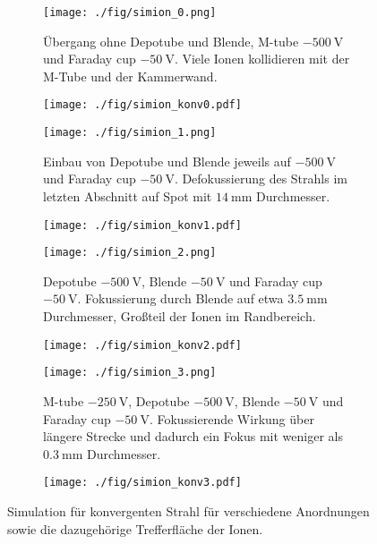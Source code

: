 \begin{figure}
  \begin{subfigure}[h]{0.50\textwidth}
    \texttt{[image: ./fig/simion\_0.png]}
    \caption{Übergang ohne Depotube und Blende, M-tube $\SI{-500}{\volt}$ und Faraday cup $\SI{-50}{\volt}$. Viele Ionen kollidieren mit der M-Tube und der Kammerwand.}
    \label{fig:konv0}
  \end{subfigure}\hfill
  \begin{subfigure}[h]{0.4\textwidth}
    \texttt{[image: ./fig/simion\_konv0.pdf]}
    \label{fig:konv1}
  \end{subfigure}\hfill
  \begin{subfigure}[h]{0.50\textwidth}
    \texttt{[image: ./fig/simion\_1.png]}
    \caption{Einbau von Depotube und Blende jeweils auf $\SI{-500}{\volt}$ und Faraday cup $\SI{-50}{\volt}$. Defokussierung des Strahls im letzten Abschnitt auf Spot mit $\SI{14}{\mm}$ Durchmesser.}
    \label{fig:konv2}
  \end{subfigure}\hfill
  \begin{subfigure}[h]{0.4\textwidth}
    \texttt{[image: ./fig/simion\_konv1.pdf]}
    \label{fig:konv3}
  \end{subfigure}\hfill
  \begin{subfigure}[h]{0.50\textwidth}
    \texttt{[image: ./fig/simion\_2.png]}
    \caption{Depotube $\SI{-500}{\volt}$, Blende $\SI{-50}{\volt}$ und Faraday cup $\SI{-50}{\volt}$. Fokussierung durch Blende auf etwa $\SI{3,5}{\mm}$ Durchmesser, Großteil der Ionen im Randbereich.}
    \label{fig:konv4}
  \end{subfigure}\hfill
  \begin{subfigure}[h]{0.4\textwidth}
    \texttt{[image: ./fig/simion\_konv2.pdf]}
    \label{fig:konv5}
  \end{subfigure}\hfill
  \begin{subfigure}[h]{0.50\textwidth}
    \texttt{[image: ./fig/simion\_3.png]}
    \caption{M-tube $\SI{-250}{\volt}$, Depotube $\SI{-500}{\volt}$, Blende $\SI{-50}{\volt}$ und Faraday cup $\SI{-50}{\volt}$. Fokussierende Wirkung über längere Strecke und dadurch ein Fokus mit weniger als $\SI{0,3}{\mm}$ Durchmesser.}
    \label{fig:konv6}
  \end{subfigure}\hfill
  \begin{subfigure}[h]{0.4\textwidth}
    \texttt{[image: ./fig/simion\_konv3.pdf]}
    \label{fig:konv7}
  \end{subfigure}
  \caption{Simulation für konvergenten Strahl für verschiedene Anordnungen sowie die dazugehörige Trefferfläche der Ionen.}
  \label{fig:simion_konv}
\end{figure}


